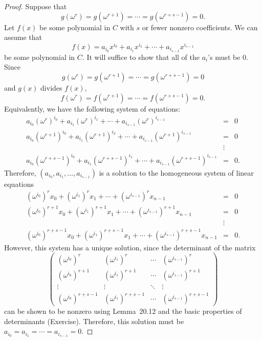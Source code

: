 \begin{proof}
Suppose that 
$$
g( \omega^r) = g(\omega^{r+1}) = \cdots = g( \omega^{r+s-1}) = 0.
$$
Let $f(x)$ be some polynomial in $C$ with $s$ or fewer nonzero coefficients.  We can assume that 
$$
f(x) = a_{i_0} x^{i_0} + a_{i_1} x^{i_1} + \cdots + a_{i_{s-1}}
x^{i_{s-1}} 
$$
be some polynomial in $C$. It will suffice to show that all of the $a_i$'s must be 0.  Since 
$$
g( \omega^r) = g(\omega^{r+1}) = \cdots = g( \omega^{r+s-1}) = 0
$$
and $g(x)$ divides $f(x)$,
$$
f( \omega^r) = f(\omega^{r+1}) = \cdots = f( \omega^{r+s-1}) = 0.
$$
Equivalently, we have the following system of equations:
\begin{eqnarray*}
a_{i_0} (\omega^r)^{i_0} + a_{i_1} (\omega^r)^{i_1} + \cdots +
a_{i_{s-1}} (\omega^r)^{i_{s-1}} & = & 0 \\ 
a_{i_0} (\omega^{r+1})^{i_0} + a_{i_1} (\omega^{r+1})^{i_2} + \cdots +
a_{i_{s-1}} (\omega^{r+1})^{i_{s-1}} & = & 0 \\ 
& \vdots & \\
a_{i_0} (\omega^{r+s-1})^{i_0} + a_{i_1} (\omega^{r+s-1})^{i_1} +
\cdots + a_{i_{s-1}} (\omega^{r+s-1})^{i_{s-1}} & = & 0.
\end{eqnarray*}
Therefore, $(a_{i_0}, a_{i_1}, \ldots, a_{i_{s-1}})$ is a solution to the homogeneous system of linear equations
\begin{eqnarray*}
(\omega^{i_0})^r x_0 + (\omega^{i_1})^r x_1 + \cdots +
(\omega^{i_{s-1}})^r x_{n-1} & = & 0 \\ 
(\omega^{i_0})^{r+1} x_0 + (\omega^{i_1})^{r+1} x_1 + \cdots +
(\omega^{i_{s-1}})^{r+1} x_{n-1} & = & 0 \\ 
& \vdots & \\
(\omega^{i_0})^{r+s-1} x_0 + (\omega^{i_1})^{r+s-1} x_1 + \cdots +
(\omega^{i_{s-1}})^{r+s-1} x_{n-1} & = & 0.
\end{eqnarray*}
However, this system has a unique solution, since the determinant of the matrix
$$
\left(
\begin{array}{cccc}
(\omega^{i_0})^r & (\omega^{i_1})^r & \cdots & (\omega^{i_{s-1}})^r \\
(\omega^{i_0})^{r+1} & (\omega^{i_1})^{r+1} & \cdots &
(\omega^{i_{s-1}})^{r+1} \\
\vdots & \vdots         & \ddots & \vdots \\
(\omega^{i_0})^{r+s-1} & (\omega^{i_1})^{r+s-1} & \cdots &
(\omega^{i_{s-1}})^{r+s-1} 
\end{array}
\right)
$$
can be shown to be nonzero using Lemma~20.12 and the basic properties of determinants (Exercise).   Therefore, 
this solution must be $a_{i_0} = a_{i_1} = \cdots = a_{i_{s-1}} = 0$.  
\end{proof}


